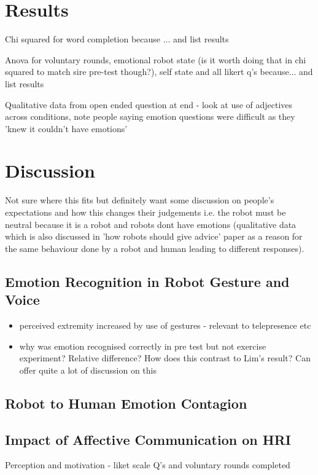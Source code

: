 \documentclass[11pt,a4paper]{report}
\begin{document}
\begin{itemize}
\chapter{Results}
Chi squared for word completion because ... and list results

Anova for voluntary rounds, emotional robot state (is it worth doing that in chi squared to match sire pre-test though?), self state and all likert q's because... and list results

Qualitative data from open ended question at end - look at use of adjectives across conditions, note people saying emotion questions were difficult as they 'knew it couldn't have emotions' 

\chapter{Discussion}

Not sure where this fits but definitely want some discussion on people's expectations and how this changes their judgements i.e. the robot must be neutral because it is a robot and robots dont have emotions (qualitative data which is also discussed in 'how robots should give advice' paper as a reason for the same behaviour done by a robot and human leading to different responses). 

\section{Emotion Recognition in Robot Gesture and Voice}
\begin{itemize}
	\item perceived extremity increased by use of gestures - relevant to telepresence etc
	\item why was emotion recognised correctly in pre test but not exercise experiment? Relative difference? How does this contrast to Lim's result? Can offer quite a lot of discussion on this
\end{itemize}

\section{Robot to Human Emotion Contagion}

\section{Impact of Affective Communication on HRI}
Perception and motivation - liket scale Q's and voluntary rounds completed


\end{itemize}
\end{document}
